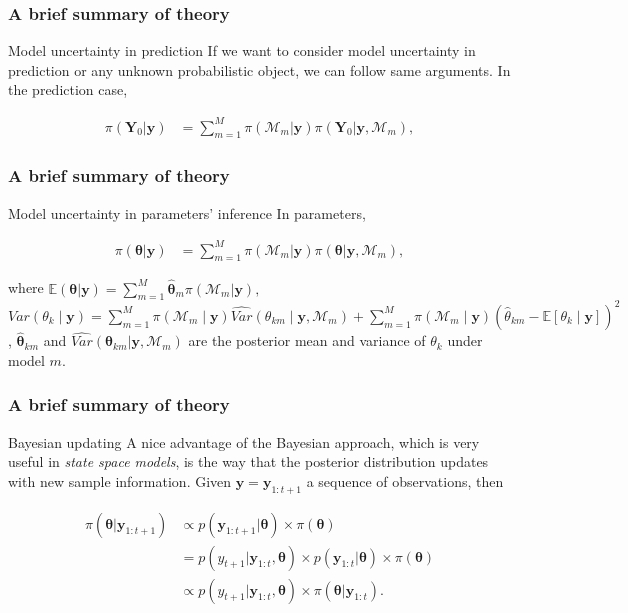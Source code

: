 \documentclass[12pt, compress]{beamer}
\begin{document}
\begin{frame}
	\frametitle{A brief summary of theory}
	
	\begin{block}{Model uncertainty in prediction}
	If we want to consider model uncertainty in prediction or any unknown probabilistic object, we can follow same arguments. In the prediction case,
	\end{block}	
	\begin{align}
	\pi(\boldsymbol{Y}_0|\boldsymbol{y})&=\sum_{m=1}^M \pi(\mathcal{M}_m|\boldsymbol{y})\pi(\boldsymbol{Y}_0|\boldsymbol{y},\mathcal{M}_m),
	\end{align}
	
\end{frame}

\begin{frame}
	\frametitle{A brief summary of theory}
	
	\begin{block}{Model uncertainty in parameters' inference}
		In parameters,
	\end{block}	
\begin{align}
\pi(\boldsymbol{\theta}|\boldsymbol{y})&=\sum_{m=1}^M \pi(\mathcal{M}_m|\boldsymbol{y})\pi(\boldsymbol{\theta}|\boldsymbol{y},\mathcal{M}_m),
\end{align}

where $\mathbb{E}(\boldsymbol{\theta}|\boldsymbol{y})=\sum_{m=1}^{M}\hat{\boldsymbol{\theta}}_m \pi(\mathcal{M}_m|\boldsymbol{y}),
$ $
Var({\theta}_k\mid \boldsymbol{y})= \sum_{m=1}^{M}\pi(\mathcal{M}_m\mid \boldsymbol{y}) \widehat{Var} ({\theta}_{km}\mid \boldsymbol{y},\mathcal{M}_m)+\sum_{m=1}^{M} \pi(\mathcal{M}_m\mid \boldsymbol{y}) (\hat{{\theta}}_{km}-\mathbb{E}[{\theta}_{k}\mid \boldsymbol{y}])^2$,
$\hat{\boldsymbol{\theta}}_{km}$ and $\widehat{Var}(\boldsymbol{\theta}_{km}|\boldsymbol{y},\mathcal{M}_m)$ are the posterior mean and variance of $\theta_k$ under model $m$.

\end{frame}

\begin{frame}
	\frametitle{A brief summary of theory}
	
	\begin{block}{Bayesian updating}
		A nice advantage of the Bayesian approach, which is very useful in \textit{state space models}, is the way that the posterior distribution updates with new sample information. Given $\boldsymbol{y}=\boldsymbol{y}_{1:t+1}$ a sequence of observations, then
	\end{block}	
	\begin{align*}
	\pi(\boldsymbol{\theta}|\boldsymbol{y}_{1:t+1})&\propto p(\boldsymbol{y}_{1:t+1}|\boldsymbol{\theta})\times \pi(\boldsymbol{\theta})\\
	&= p(y_{t+1}|\boldsymbol{y}_{1:t},\boldsymbol{\theta})\times p(\boldsymbol{y}_{1:t}|\boldsymbol{\theta})\times \pi(\boldsymbol{\theta})\\
	&\propto p(y_{t+1}|\boldsymbol{y}_{1:t},\boldsymbol{\theta})\times \pi(\boldsymbol{\theta}|\boldsymbol{y}_{1:t}). 
	\end{align*}
	
\end{frame}
\end{document}
